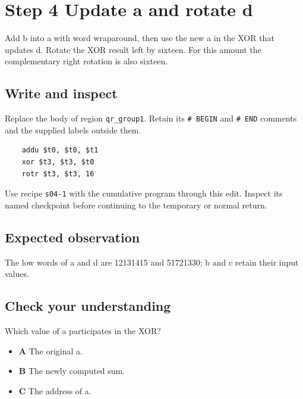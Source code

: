 \section{Step 4 Update a and rotate d}\label{chacha-s04}

Add b into a with word wraparound, then use the new a in the XOR that updates d. Rotate the XOR result left by sixteen. For this amount the complementary right rotation is also sixteen.

\subsection{Write and inspect}
Replace the body of region \texttt{qr\_group1}. Retain its \texttt{\# BEGIN} and \texttt{\# END} comments and the supplied labels outside them.

\begin{verbatim}
    addu $t0, $t0, $t1
    xor $t3, $t3, $t0
    rotr $t3, $t3, 16
\end{verbatim}

Use recipe \texttt{s04-1} with the cumulative program through this edit. Inspect its named checkpoint before continuing to the temporary or normal return.

\subsection{Expected observation}
The low words of a and d are 12131415 and 51721330; b and c retain their input values.

\subsection{Check your understanding}
Which value of a participates in the XOR?

\begin{itemize}
  \item \textbf{A} The original a.
  \item \textbf{B} The newly computed sum.
  \item \textbf{C} The address of a.
\end{itemize}
